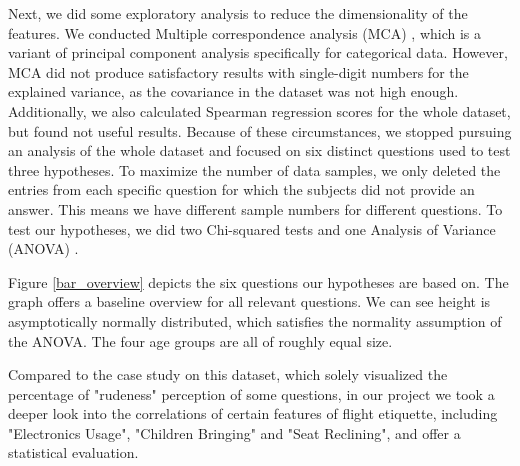 \documentclass{article}
\theoremstyle{plain}
\theoremstyle{definition}
\theoremstyle{remark}
\begin{document}
Next, we did some exploratory analysis to reduce the dimensionality of the features. We conducted Multiple correspondence analysis (MCA) \citep{abdi2007multiple}, which is a variant of principal component analysis specifically for categorical data. However, MCA did not produce satisfactory results with single-digit numbers for the explained variance, as the covariance in the dataset was not high enough. Additionally, we also calculated Spearman regression scores for the whole dataset, but found not useful results. Because of these circumstances, we stopped pursuing an analysis of the whole dataset and focused on six distinct questions used to test three hypotheses. To maximize the number of data samples, we only deleted the entries from each specific question for which the subjects did not provide an answer. This means we have different sample numbers for different questions. To test our hypotheses, we did two Chi-squared tests \citep{Pearson1900} and one Analysis of Variance (ANOVA) \citep{anova}.

Figure \ref{bar_overview} depicts the six questions our hypotheses are based on. The graph offers a baseline overview for all relevant questions. We can see height is asymptotically normally distributed, which satisfies the normality assumption of the ANOVA. The four age groups are all of roughly equal size.

Compared to the case study \citep{relatedwork} on this dataset, which solely visualized the percentage of "rudeness" perception of some questions, in our project we took a deeper look into the correlations of certain features of flight etiquette, including "Electronics Usage", "Children Bringing" and "Seat Reclining", and offer a statistical evaluation.


% 
\end{document}
